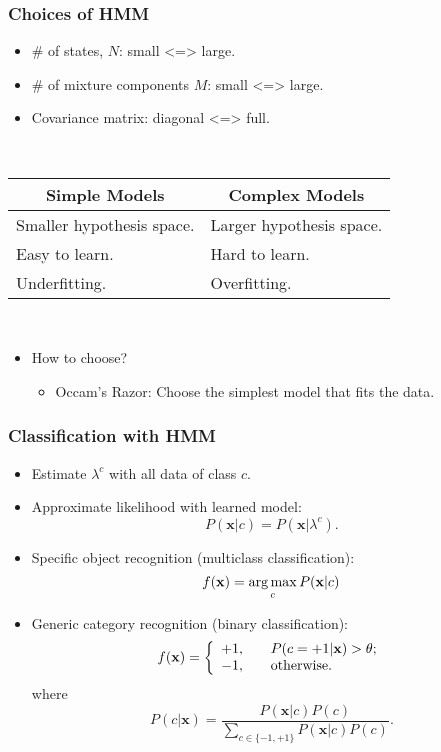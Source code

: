 \documentclass{beamer}
\begin{document}
\begin{frame}
  \frametitle{Choices of HMM}

  \begin{itemize}
    \item \# of states, $N$: \hfill small <=> large.
    \item \# of mixture components $M$: \hfill small <=> large.
    \item Covariance matrix: \hfill diagonal <=> full.
  \end{itemize}

  ~

  \centering
  \begin{tabular}{p{}|p{}}
    \hline
    \multicolumn{1}{c|}{\bfseries Simple Models} & \multicolumn{1}{c}{\bfseries Complex Models} \\ \hline
    Smaller hypothesis space. & Larger hypothesis space. \\
    Easy to learn. & Hard to learn. \\
    Underfitting. & Overfitting. \\ \hline
  \end{tabular}

  ~

  \begin{itemize}
    \item How to choose?
      \begin{itemize}
        \item Occam's Razor: Choose the simplest model that fits the data.
      \end{itemize}
  \end{itemize}
\end{frame}

\begin{frame}
  \frametitle{Classification with HMM}

  \begin{itemize}
    \item Estimate $\lambda^c$ with all data of class $c$.

    \item Approximate likelihood with learned model:
      \[ P(\mathbf{x}|c) = P(\mathbf{x}|\lambda^c) . \]
    \item Specific object recognition (multiclass classification):
      \[ f(\mathbf{x}) = \operatorname*{arg\,max}_{c} P(\mathbf{x}|c) \]
    \item Generic category recognition (binary classification):
      \[ 
        f(\mathbf{x}) = \left\{
          \begin{array}{l l}
            +1, & \quad P(c=+1|\mathbf{x}) > \theta; \\
            -1, & \quad \text{otherwise.}
          \end{array} \right.
        \]
        where
        \[ P(c|\mathbf{x}) = \frac{P(\mathbf{x}|c)P(c)}{\sum_{c \in \{-1,+1\}} P(\mathbf{x}|c)P(c)} . \]
    \end{itemize}
  \end{frame}
\end{document}
